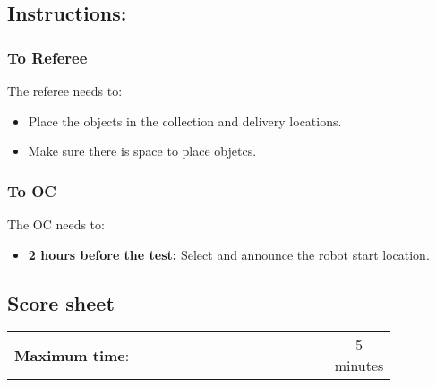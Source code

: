 \subsection*{Instructions:}
\subsubsection*{To Referee}

The referee needs to:
\begin{itemize}
	\item Place the objects in the collection and delivery locations.
	\item Make sure there is space to place objetcs. 
\end{itemize}

\subsubsection*{To OC}
The OC needs to:
\begin{itemize}
	\item \textbf{2 hours before the test:} Select and announce the robot start location.
\end{itemize}

\newpage
\subsection*{Score sheet}

\begin{table}[h]
	\begin{tabular}{m{0.85\linewidth} c}
		\textbf{Maximum time}: & 5 minutes \\
	\end{tabular}
\end{table}

\begin{scorelist}

	


\end{scorelist}

\clearpage
